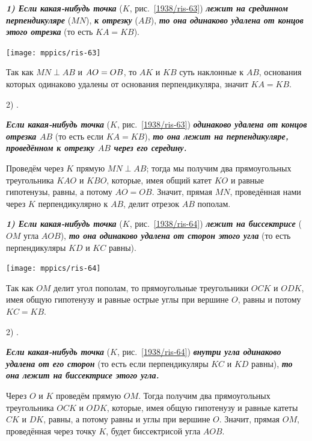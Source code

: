 \documentclass[oneside]{book}
\begin{document}
\setlength{\columnseprule}{.2pt}
\begin{paracol}{2}

{\sloppy

\textbf{\emph{1) Если какая-нибудь точка}} ($K$, рис.~\ref{1938/ris-63}) \textbf{\emph{лежит на срединном перпендикуляре}} ($MN$), \textbf{\emph{к отрезку}} ($AB$), \textbf{\emph{то она одинаково удалена от концов этого отрезка}} (то есть $KA=KB$).

\bigskip

{\centering
\texttt{[image: mppics/ris-63]}
\label{1938/ris-63}
\addtocounter{figure}{1}
}

\medskip

Так как \mbox{$MN\perp AB$} и $AO\z=OB$, то $AK$ и $KB$ суть наклонные к $AB$, основания которых одинаково удалены от основания перпендикуляра, значит $KA=KB$.

2) .

\textbf{\emph{Если какая-нибудь точка}} ($K$, рис.~\ref{1938/ris-63}) \textbf{\emph{одинаково удалена от концов отрезка $AB$}} (то есть если $KA=KB$), \textbf{\emph{то она лежит на перпендикуляре, проведённом к отрезку $AB$ через его середину.}}

Проведём через $K$ прямую $MN\perp AB$;
тогда мы получим два прямоугольных треугольника $KAO$ и $KBO$, которые, имея общий катет $KO$ и равные гипотенузы, равны, а потому $AO=OB$.
Значит, прямая $MN$, проведённая нами через $K$ перпендикулярно к $AB$, делит отрезок $AB$ пополам.

}

\switchcolumn

{\sloppy

\textbf{\emph{1) Если какая-нибудь точка}} ($K$, рис.~\ref{1938/ris-64}) \textbf{\emph{лежит на биссектрисе}} ($OM$ угла $AOB$), \textbf{\emph{то она одинаково удалена от сторон этого угла}} (то есть перпендикуляры $KD$ и $KC$ равны).

\bigskip

{\centering
\addtocounter{figure}{1}
\texttt{[image: mppics/ris-64]}
\label{1938/ris-64}
\addtocounter{figure}{1}
}

\medskip

Так как $OM$ делит угол пополам, то прямоугольные треугольники $OCK$ и $ODK$, имея общую гипотенузу и равные острые углы при вершине $O$, равны и потому $KC=KB$.

2) .

\textbf{\emph{Если какая-нибудь точка}} ($K$, рис.~\ref{1938/ris-64}) \textbf{\emph{внутри угла одинаково удалена от его сторон}} (то есть если перпендикуляры $KC$ и $KD$ равны), \textbf{\emph{то она лежит на биссектрисе этого угла.}}

Через $O$ и $K$ проведём прямую $OM$.
Тогда получим два прямоугольных треугольника $OCK$ и $ODK$, которые, имея общую гипотенузу и равные катеты $CK$ и $DK$, равны, а потому равны и углы при вершине $O$.
Значит, прямая $OM$, проведённая через точку $K$, будет биссектрисой угла $AOB$.



}
\end{paracol}
\end{document}
